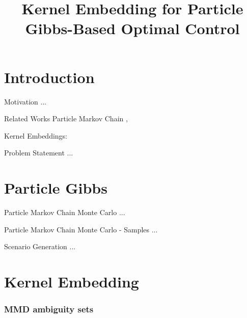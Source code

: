 \documentclass[student, noshadow, lsr, english, aspectratio=169]{ITR_LSR_slides}
\title{Kernel Embedding for Particle Gibbs-Based Optimal Control}
\begin{document}
\begin{frame}
    \titlepage
\end{frame}


\section{Introduction}
\begin{frame}{Motivation}	
...
\end{frame}


\begin{frame}{Related Works}
Particle Markov Chain	
\cite{Robert_24}, \cite{Andrieu_10}

Kernel Embeddings:
\cite{Yassine_22}

\end{frame}


\begin{frame}{Problem Statement}	
...
\end{frame}


\section{Particle Gibbs}

\begin{frame}{Particle Markov Chain Monte Carlo}
...
\end{frame}

\begin{frame}{Particle Markov Chain Monte Carlo - Samples}
...
\end{frame}

\begin{frame}{Scenario Generation}
...
\end{frame}


\section{Kernel Embedding}

\begin{frame}
	\frametitle{MMD ambiguity sets}
	
\end{frame}
\end{document}
